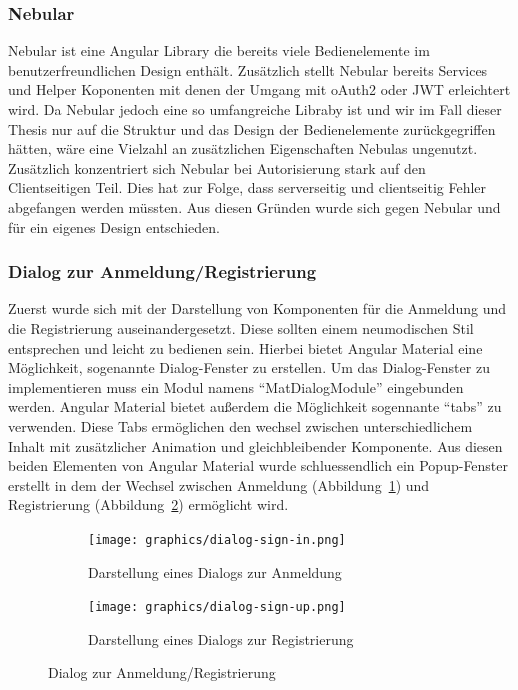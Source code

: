 \subsubsection{Nebular}
\label{sec: nebular}
Nebular ist eine Angular Library die bereits viele Bedienelemente im benutzerfreundlichen Design enthält. Zusätzlich stellt Nebular bereits Services und Helper Koponenten mit denen der Umgang mit \gls{oAuth2} oder \gls{JWT} erleichtert wird. Da Nebular jedoch eine so umfangreiche Libraby ist und wir im Fall dieser Thesis nur auf die Struktur und das Design der Bedienelemente zurückgegriffen hätten, wäre eine Vielzahl an zusätzlichen Eigenschaften Nebulas ungenutzt. Zusätzlich konzentriert sich Nebular bei Autorisierung stark auf den Clientseitigen Teil. Dies hat zur Folge, dass serverseitig und clientseitig Fehler abgefangen werden müssten. Aus diesen Gründen wurde sich gegen Nebular und für ein eigenes Design entschieden.

\subsubsection{Dialog zur Anmeldung/Registrierung}
\label{sec:client-dialog-authentication}
Zuerst wurde sich mit der Darstellung von Komponenten für die Anmeldung und die Registrierung auseinandergesetzt. Diese sollten einem neumodischen Stil entsprechen und leicht zu bedienen sein. Hierbei bietet Angular Material eine Möglichkeit, sogenannte Dialog-Fenster zu erstellen. Um das Dialog-Fenster zu implementieren muss ein Modul namens \enquote{MatDialogModule} eingebunden werden. Angular Material bietet außerdem die Möglichkeit sogennante \enquote{tabs} zu verwenden. Diese Tabs ermöglichen den wechsel zwischen unterschiedlichem Inhalt mit zusätzlicher Animation und gleichbleibender Komponente. Aus diesen beiden Elementen von Angular Material wurde schluessendlich ein Popup-Fenster erstellt in dem der Wechsel zwischen Anmeldung (Abbildung~\ref{fig:dialog_sign_in}) und Registrierung (Abbildung~\ref{fig:dialog_sign_up}) ermöglicht wird.

\begin{figure}
	\centering
	\begin{subfigure}{.5\textwidth}
		\texttt{[image: graphics/dialog-sign-in.png]}
		\caption{Darstellung eines Dialogs zur Anmeldung}
		\label{fig:dialog_sign_in}
	\end{subfigure}%
	\begin{subfigure}{.5\textwidth}
		\texttt{[image: graphics/dialog-sign-up.png]}
		\caption{Darstellung eines Dialogs zur Registrierung}
		\label{fig:dialog_sign_up}
	\end{subfigure}
	\caption{Dialog zur Anmeldung/Registrierung}
	\label{fig:auth-dialog}
\end{figure}

